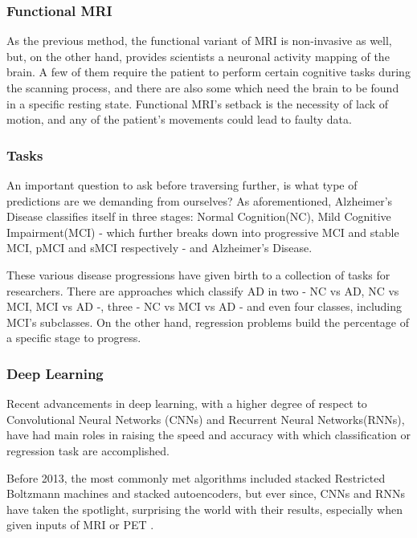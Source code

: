 \documentclass[a4paper, 12pt]{article}
\begin{document}
\subsubsection*{Functional MRI} %
As the previous method, the functional variant of MRI is non-invasive as well, but, on the other hand, provides
scientists a neuronal activity mapping of the brain. A few of them require the patient to perform certain cognitive tasks
during the scanning process, and there are also some which need the brain to be found in a specific resting state.
Functional MRI's setback is the necessity of lack of motion, and any of the patient's movements could lead to faulty
data.


\subsubsection*{Tasks}
An important question to ask before traversing further, is what type of predictions are we demanding from ourselves?
As aforementioned, Alzheimer's Disease classifies itself in three stages: Normal Cognition(NC), Mild Cognitive Impairment(MCI)
- which further breaks down into progressive MCI and stable MCI, pMCI and sMCI respectively - and Alzheimer's Disease.

These various disease progressions have given birth to a collection of tasks for researchers. There are approaches
which classify AD in two - NC vs AD, NC vs MCI, MCI vs AD -, three - NC vs MCI vs AD - and even four classes, including MCI's
subclasses. On the other hand, regression problems build the percentage of a specific stage to progress.

\subsubsection*{Deep Learning}
Recent advancements in deep learning, with a higher degree of respect to Convolutional Neural Networks (CNNs) and Recurrent
Neural Networks(RNNs), have had main roles in raising the speed and accuracy with which classification or regression task
are accomplished.

Before 2013, the most commonly met algorithms included stacked Restricted Boltzmann machines and stacked autoencoders,
but ever since, CNNs and RNNs have taken the spotlight, surprising the world with their results, especially when given
inputs of MRI or PET \cite{make6010024}.
\end{document}
